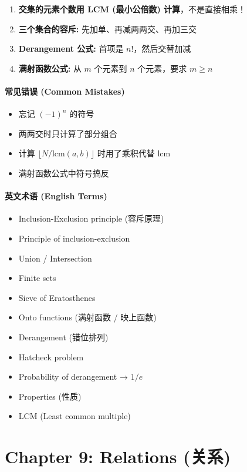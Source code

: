 \documentclass[10pt,a4paper,openany]{ctexbook}
\theoremstyle{definition}
\theoremstyle{remark}
\begin{document}
\begin{enumerate}
\item \textbf{交集的元素个数用 LCM (最小公倍数) 计算}，不是直接相乘！
\item \textbf{三个集合的容斥:} 先加单、再减两两交、再加三交
\item \textbf{Derangement 公式:} 首项是 $n!$，然后交替加减
\item \textbf{满射函数公式:} 从 $m$ 个元素到 $n$ 个元素，要求 $m \ge n$

\end{enumerate}

\subsubsection{常见错误 (Common Mistakes)}

\begin{itemize}
\item 忘记 $(-1)^n$ 的符号
\item 两两交时只计算了部分组合
\item 计算 $\lfloor N/\text{lcm}(a,b)\rfloor$ 时用了乘积代替 lcm
\item 满射函数公式中符号搞反

\end{itemize}

\subsubsection{英文术语 (English Terms)}

\begin{itemize}
\item Inclusion-Exclusion principle (容斥原理)
\item Principle of inclusion-exclusion
\item Union / Intersection
\item Finite sets
\item Sieve of Eratosthenes
\item Onto functions (满射函数 / 映上函数)
\item Derangement (错位排列)
\item Hatcheck problem
\item Probability of derangement → $1/e$
\item Properties (性质)
\item LCM (Least common multiple)

\end{itemize}

\chapter{Chapter 9: Relations (关系)}
\end{document}

